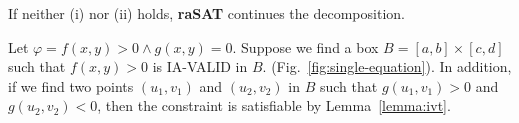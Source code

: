 \documentclass[runningheads,a4paper,oribibl]{llncs}
\newcommand{\suppress}[1]{} %
\begin{document}
\suppress{
\begin{proof}
\begin{enumerate}[(i)]
\item If $l_g > 0$ or $h_g < 0$, then $g=0$ cannot be satisfied in box $I$.
  As a result, $F$ is UNSAT in $I$. 
\item If there are two instances $\vec{t},\vec{t'}$ in the box with
  $g(\vec{t}) > 0$ and $g(\vec{t'}) < 0$, it is clear from the Intermediate
  Value Theorem that there exist one point $\vec{t_0}$ between $\vec{t}$ and
  $\vec{t'}$ such that $g(\vec{t_0}) = 0$. In addition, because
  $\bigwedge \limits_{j}^m f_j > 0$ is IA-VALID in $I$, $\vec{t_0}$ also
  satisfies $\bigwedge \limits_{j}^m f_j > 0$.
  As a result, $F$ is satisfiable with $\vec{t_0}$ as the SAT instance.
\end{enumerate}
\end{proof}
}
If neither (i) nor (ii) holds, \textbf{raSAT} continues the decomposition.
\begin{example}
  Let $\varphi = f(x, y) > 0 \wedge g(x, y) = 0$.
  Suppose we find a box 
  ${B = [a, b] \times [c, d]}$
  such that $f(x, y) > 0$ is IA-VALID in $B$.
  (Fig.~\ref{fig:single-equation}).
  In addition, 
  if we find two points $(u_1, v_1)$ and $(u_2, v_2)$ in $B$ such that
  $g(u_1, v_1) > 0$ and $g(u_2, v_2) < 0$,
  then the constraint is satisfiable by Lemma~\ref{lemma:ivt}. 
\end{example}
\end{document}
